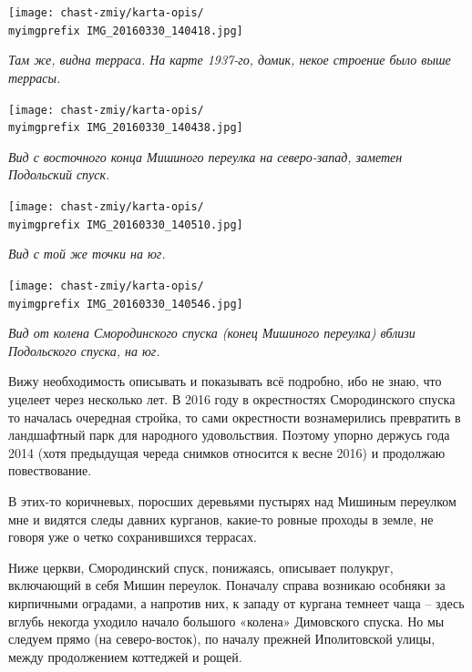\begin{center}
\texttt{[image: chast-zmiy/karta-opis/\\myimgprefix IMG\_20160330\_140418.jpg]}

\textit{Там же, видна терраса. На карте 1937-го, домик, некое строение было выше террасы.}
\end{center}


\begin{center}
\texttt{[image: chast-zmiy/karta-opis/\\myimgprefix IMG\_20160330\_140438.jpg]}

\textit{Вид с восточного конца Мишиного переулка на северо-запад, заметен Подольский спуск.}
\end{center}

\newpage
\begin{center}
\texttt{[image: chast-zmiy/karta-opis/\\myimgprefix IMG\_20160330\_140510.jpg]}

\textit{Вид с той же точки на юг.}
\end{center}

\begin{center}
\texttt{[image: chast-zmiy/karta-opis/\\myimgprefix IMG\_20160330\_140546.jpg]}

\textit{Вид от колена Смородинского спуска (конец Мишиного переулка) вблизи Подольского спуска, на юг.}
\end{center}

\newpage

Вижу необходимость описывать и показывать всё подробно, ибо не знаю, что уцелеет через несколько лет. В 2016 году в окрестностях Смородинского спуска то началась очередная стройка, то сами окрестности вознамерились превратить в ландшафтный парк для народного удовольствия. Поэтому упорно держусь года 2014 (хотя предыдущая череда снимков относится к весне 2016) и продолжаю повествование.

В этих-то коричневых, поросших деревьями пустырях над Мишиным переулком мне и видятся следы давних курганов, какие-то ровные проходы в земле, не говоря уже о четко сохранившихся террасах.

Ниже церкви, Смородинский спуск, понижаясь, описывает полукруг, включающий в себя Мишин переулок. Поначалу справа возникаю особняки за кирпичными оградами, а напротив них, к западу от кургана темнеет чаща – здесь вглубь некогда уходило начало большого «колена» Димовского спуска. Но мы следуем прямо (на северо-восток), по началу прежней Иполитовской улицы, между продолжением коттеджей и рощей.

